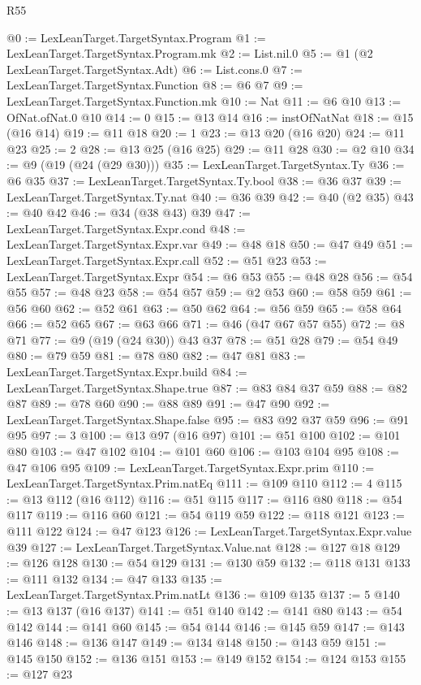 \begin{lexlean}{R55}
\begin{coremodule}
@0 := LexLeanTarget.TargetSyntax.Program
@1 := LexLeanTarget.TargetSyntax.Program.mk
@2 := List.nil.{0}
@5 := @1 (@2 LexLeanTarget.TargetSyntax.Adt)
@6 := List.cons.{0}
@7 := LexLeanTarget.TargetSyntax.Function
@8 := @6 @7
@9 := LexLeanTarget.TargetSyntax.Function.mk
@10 := Nat
@11 := @6 @10
@13 := OfNat.ofNat.{0} @10
@14 := 0
@15 := @13 @14
@16 := instOfNatNat
@18 := @15 (@16 @14)
@19 := @11 @18
@20 := 1
@23 := @13 @20 (@16 @20)
@24 := @11 @23
@25 := 2
@28 := @13 @25 (@16 @25)
@29 := @11 @28
@30 := @2 @10
@34 := @9 (@19 (@24 (@29 @30)))
@35 := LexLeanTarget.TargetSyntax.Ty
@36 := @6 @35
@37 := LexLeanTarget.TargetSyntax.Ty.bool
@38 := @36 @37
@39 := LexLeanTarget.TargetSyntax.Ty.nat
@40 := @36 @39
@42 := @40 (@2 @35)
@43 := @40 @42
@46 := @34 (@38 @43) @39
@47 := LexLeanTarget.TargetSyntax.Expr.cond
@48 := LexLeanTarget.TargetSyntax.Expr.var
@49 := @48 @18
@50 := @47 @49
@51 := LexLeanTarget.TargetSyntax.Expr.call
@52 := @51 @23
@53 := LexLeanTarget.TargetSyntax.Expr
@54 := @6 @53
@55 := @48 @28
@56 := @54 @55
@57 := @48 @23
@58 := @54 @57
@59 := @2 @53
@60 := @58 @59
@61 := @56 @60
@62 := @52 @61
@63 := @50 @62
@64 := @56 @59
@65 := @58 @64
@66 := @52 @65
@67 := @63 @66
@71 := @46 (@47 @67 @57 @55)
@72 := @8 @71
@77 := @9 (@19 (@24 @30)) @43 @37
@78 := @51 @28
@79 := @54 @49
@80 := @79 @59
@81 := @78 @80
@82 := @47 @81
@83 := LexLeanTarget.TargetSyntax.Expr.build
@84 := LexLeanTarget.TargetSyntax.Shape.true
@87 := @83 @84 @37 @59
@88 := @82 @87
@89 := @78 @60
@90 := @88 @89
@91 := @47 @90
@92 := LexLeanTarget.TargetSyntax.Shape.false
@95 := @83 @92 @37 @59
@96 := @91 @95
@97 := 3
@100 := @13 @97 (@16 @97)
@101 := @51 @100
@102 := @101 @80
@103 := @47 @102
@104 := @101 @60
@106 := @103 @104 @95
@108 := @47 @106 @95
@109 := LexLeanTarget.TargetSyntax.Expr.prim
@110 := LexLeanTarget.TargetSyntax.Prim.natEq
@111 := @109 @110
@112 := 4
@115 := @13 @112 (@16 @112)
@116 := @51 @115
@117 := @116 @80
@118 := @54 @117
@119 := @116 @60
@121 := @54 @119 @59
@122 := @118 @121
@123 := @111 @122
@124 := @47 @123
@126 := LexLeanTarget.TargetSyntax.Expr.value @39
@127 := LexLeanTarget.TargetSyntax.Value.nat
@128 := @127 @18
@129 := @126 @128
@130 := @54 @129
@131 := @130 @59
@132 := @118 @131
@133 := @111 @132
@134 := @47 @133
@135 := LexLeanTarget.TargetSyntax.Prim.natLt
@136 := @109 @135
@137 := 5
@140 := @13 @137 (@16 @137)
@141 := @51 @140
@142 := @141 @80
@143 := @54 @142
@144 := @141 @60
@145 := @54 @144
@146 := @145 @59
@147 := @143 @146
@148 := @136 @147
@149 := @134 @148
@150 := @143 @59
@151 := @145 @150
@152 := @136 @151
@153 := @149 @152
@154 := @124 @153
@155 := @127 @23

\end{coremodule}
\end{lexlean}
